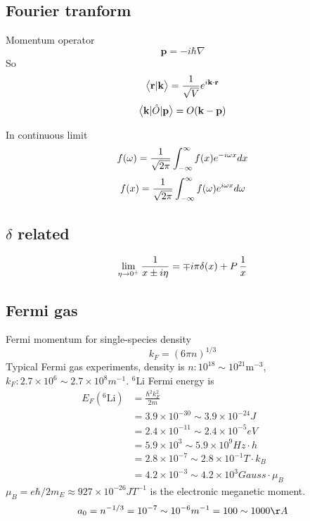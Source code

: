 \subsection{Fourier tranform}
Momentum operator
\begin{equation}
\mathbf{p}=-i\hbar\nabla
\end{equation}
So 
\begin{equation}
\bigl<{{\mathbf{r}}|{\mathbf{k}}}\bigr>=\frac{1}{\sqrt{V}}e^{i\mathbf{k}\cdot\mathbf{r}}
\end{equation}
\begin{equation}
\bigl<{\mathbf{k}{\lvert{\hat{O}}\rvert}\mathbf{p}}\bigr>=O(\mathbf{k}-\mathbf{p})
\end{equation}

In continuous limit
\begin{equation}
f(\omega)=\frac{1}{\sqrt{2\pi}}\int_{-\infty}^{\infty}{f(x)}e^{-i\omega{x}}dx
\end{equation}
\begin{equation}
f(x)=\frac{1}{\sqrt{2\pi}}\int_{-\infty}^{\infty}{f(\omega)}e^{i\omega{x}}d\omega
\end{equation}

\subsection{$\delta$ related}
\begin{equation}
\lim_{\eta\rightarrow0^{+}}\frac{1}{x\pm{}i\eta}=\mp{}i\pi\delta{(x)}+P\,\frac{1}{x}
\end{equation}


\subsection{Fermi gas}
Fermi momentum for single-species density
\begin{equation}
k_{F}=(6\pi{}n)^{1/3}
\end{equation}
Typical Fermi gas experiments, density is $n:10^{18}\sim 10^{21}\text{m}^{-3}$, $k_{F}:2.7\times10^{6}\sim2.7\times10^{8}m^{-1}$.
${}^{6}\text{Li}$ Fermi energy is
\begin{align}
E_{F}({}^{6}\text{Li})&=\frac{\hbar^{2}k_{F}^{2}}{2m}\\
&=3.9\times10^{-30}\sim3.9\times10^{-24}J\\
&=2.4\times10^{-11}\sim2.4\times10^{-5}eV\\
&=5.9\times10^{3}\sim5.9\times10^{9}Hz\cdot{}h\\
&=2.8\times10^{-7}\sim2.8\times10^{-1}T\cdot{}k_{B}\\
&=4.2\times10^{-3}\sim4.2\times10^{3}Gauss\cdot{}\mu_{B}
\end{align}
$\mu_{B}=e\hbar/2m_{E}\approx927\times10^{-26}JT^{-1}$ is the electronic meganetic moment.
\begin{equation}
a_{0}=n^{-1/3}=10^{-7}\sim10^{-6}m^{-1}=100\sim1000\AA
\end{equation}
